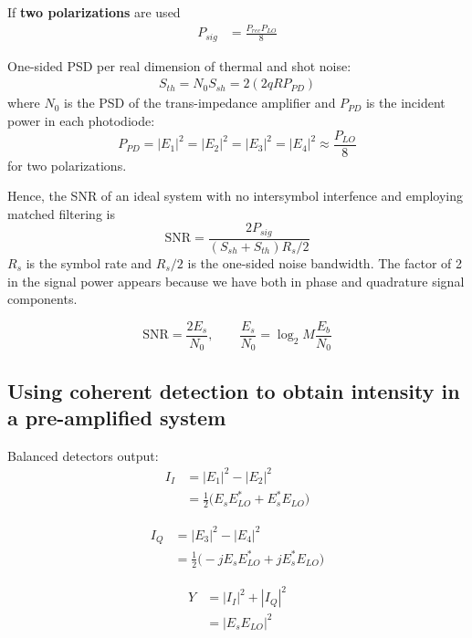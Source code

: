 \documentclass[a4paper]{article}
\begin{document}
If \textbf{two polarizations} are used
\begin{align} 
P_{sig} &= \frac{P_{rec}P_{LO}}{8}
\end{align}

One-sided PSD per real dimension of thermal and shot noise:
\begin{align}
S_{th} = N_0
S_{sh} = 2(2qRP_{PD})
\end{align}
where $N_0$ is the PSD of the trans-impedance amplifier and $P_{PD}$ is the incident power in each photodiode:
\begin{equation}
P_{PD} = |E_1|^2 = |E_2|^2 = |E_3|^2 = |E_4|^2 \approx \frac{P_{LO}}{8}
\end{equation}
for two polarizations.

Hence, the SNR of an ideal system with no intersymbol interfence and employing matched filtering is 
\begin{equation}
\mathrm{SNR} = \frac{2P_{sig}}{(S_{sh} + S_{th})R_s/2}
\end{equation}
$R_s$ is the symbol rate and $R_s/2$ is the one-sided noise bandwidth. The factor of 2 in the signal power appears because we have both in phase and quadrature signal components.

\begin{equation}
\mathrm{SNR} = \frac{2E_s}{N_0}, \qquad \frac{E_s}{N_0} = \log_2M\frac{E_b}{N_0}
\end{equation}

\subsection{Using coherent detection to obtain intensity in a pre-amplified system}

Balanced detectors output:
\begin{align} \nonumber
I_I &= |E_1|^2 - |E_2|^2 \\ \nonumber
&= \frac{1}{2}\Big(E_sE_{LO}^* + E_s^*E_{LO} \Big)
\end{align}

\begin{align} \nonumber
I_Q &= |E_3|^2 - |E_4|^2 \\ \nonumber
&= \frac{1}{2}\Big(-jE_sE_{LO}^* + jE_s^*E_{LO}\Big)
\end{align}

\begin{align} \nonumber
Y &= |I_I|^2 + |I_Q|^2 \\ \nonumber
&= |E_sE_{LO}|^2
\end{align}
\end{document}
